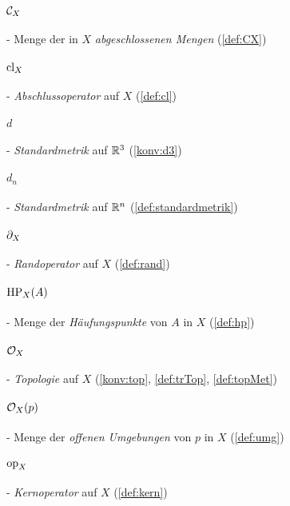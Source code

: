     \paragraph{$\mathcal{C}_X$} - \quad Menge der in $X$ \textit{abgeschlossenen Mengen} (\ref{def:CX})

    \paragraph{$\text{cl}_X$} - \quad \textit{Abschlussoperator} auf $X$ (\ref{def:cl})

    \paragraph{$d$} - \quad \textit{Standardmetrik} auf $\mathbb{R}^3$ (\ref{konv:d3})
    
    \paragraph{$d_n$} - \quad \textit{Standardmetrik} auf $\mathbb{R}^n$ (\ref{def:standardmetrik})
    
    \paragraph{$\partial_X$} - \quad \textit{Randoperator} auf $X$ (\ref{def:rand})

    \paragraph{$\text{HP}_X(A)$} - \quad Menge der \textit{Häufungspunkte} von $A$ in $X$ (\ref{def:hp})
 
    \paragraph{$\mathcal{O}_X$} - \quad \textit{Topologie} auf $X$ (\ref{konv:top}, \ref{def:trTop}, \ref{def:topMet})

    \paragraph{$\mathcal{O}_X(p)$} - \quad Menge der \textit{offenen Umgebungen} von $p$ in $X$ (\ref{def:umg})

    \paragraph{$\text{op}_X$} - \quad \textit{Kernoperator} auf $X$ (\ref{def:kern})




